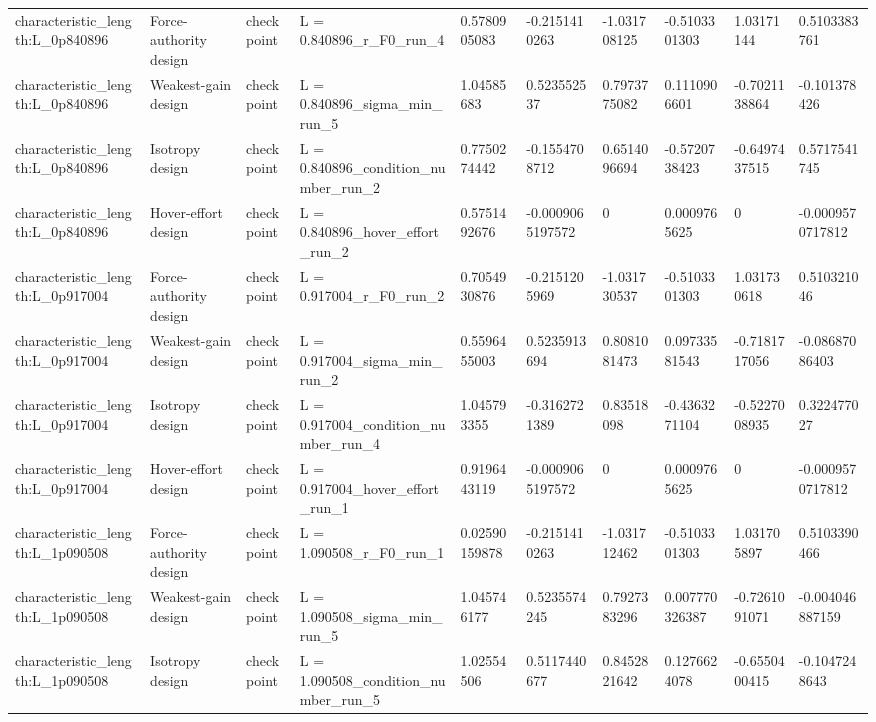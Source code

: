 \begin{tabular}{@{}llllllllll@{}}
characteristic\_length:L\_0p840896 & Force-authority design & checkpoint & L = 0.840896\_r\_F0\_run\_4 & 0.5780905083 & -0.2151410263 & -1.031708125 & -0.5103301303 & 1.03171144 & 0.5103383761 \\
characteristic\_length:L\_0p840896 & Weakest-gain design & checkpoint & L = 0.840896\_sigma\_min\_run\_5 & 1.04585683 & 0.523552537 & 0.7973775082 & 0.1110906601 & -0.7021138864 & -0.101378426 \\
characteristic\_length:L\_0p840896 & Isotropy design & checkpoint & L = 0.840896\_condition\_number\_run\_2 & 0.7750274442 & -0.1554708712 & 0.6514096694 & -0.5720738423 & -0.6497437515 & 0.5717541745 \\
characteristic\_length:L\_0p840896 & Hover-effort design & checkpoint & L = 0.840896\_hover\_effort\_run\_2 & 0.5751492676 & -0.0009065197572 & 0 & 0.0009765625 & 0 & -0.0009570717812 \\
characteristic\_length:L\_0p917004 & Force-authority design & checkpoint & L = 0.917004\_r\_F0\_run\_2 & 0.7054930876 & -0.2151205969 & -1.031730537 & -0.5103301303 & 1.031730618 & 0.510321046 \\
characteristic\_length:L\_0p917004 & Weakest-gain design & checkpoint & L = 0.917004\_sigma\_min\_run\_2 & 0.5596455003 & 0.5235913694 & 0.8081081473 & 0.09733581543 & -0.7181717056 & -0.08687086403 \\
characteristic\_length:L\_0p917004 & Isotropy design & checkpoint & L = 0.917004\_condition\_number\_run\_4 & 1.045793355 & -0.3162721389 & 0.83518098 & -0.4363271104 & -0.5227008935 & 0.322477027 \\
characteristic\_length:L\_0p917004 & Hover-effort design & checkpoint & L = 0.917004\_hover\_effort\_run\_1 & 0.9196443119 & -0.0009065197572 & 0 & 0.0009765625 & 0 & -0.0009570717812 \\
characteristic\_length:L\_1p090508 & Force-authority design & checkpoint & L = 1.090508\_r\_F0\_run\_1 & 0.02590159878 & -0.2151410263 & -1.031712462 & -0.5103301303 & 1.031705897 & 0.5103390466 \\
characteristic\_length:L\_1p090508 & Weakest-gain design & checkpoint & L = 1.090508\_sigma\_min\_run\_5 & 1.045746177 & 0.5235574245 & 0.7927383296 & 0.007770326387 & -0.7261091071 & -0.004046887159 \\
characteristic\_length:L\_1p090508 & Isotropy design & checkpoint & L = 1.090508\_condition\_number\_run\_5 & 1.02554506 & 0.5117440677 & 0.8452821642 & 0.1276624078 & -0.6550400415 & -0.1047248643 \\

\end{tabular}
